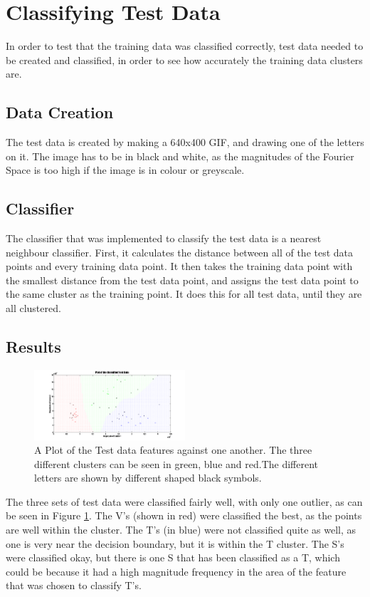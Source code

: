 \documentclass[a4paper]{article}
\begin{document}
\section{Classifying Test Data}
In order to test that the training data was classified correctly, test data needed to be created and classified, in order to see how accurately the training data clusters are. 
\subsection{Data Creation}
The test data is created by making a 640x400 GIF, and drawing one of the letters on it. The image has to be in black and white, as the magnitudes of the Fourier Space is too high if the image is in colour or greyscale. 
\subsection{Classifier}
The classifier that was implemented to classify the test data is a nearest neighbour classifier. First, it calculates the distance between all of the test data points and every training data point. It then takes the training data point with the smallest distance from the test data point, and assigns the test data point to the same cluster as the training point. It does this for all test data, until they are all clustered.
\subsection{Results}
\begin{figure}[H]
\centering
\includegraphics[width=0.5\textwidth]{plottest.png}
\caption{\label{fig:plottest}A Plot of the Test data features against one another. The three different clusters can be seen in green, blue and red.The different letters are shown by different shaped black symbols.}
\end{figure}
The three sets of test data were classified fairly well, with only one outlier, as can be seen in Figure \ref{fig:plottest}. The V's (shown in red) were classified the best, as the points are well within the cluster. The T's (in blue) were not classified quite as well, as one is very near the decision boundary, but it is within the T cluster. The S's were classified okay, but there is one S that has been classified as a T, which could be because it had a high magnitude frequency in the area of the feature that was chosen to classify T's. 
\end{document}
